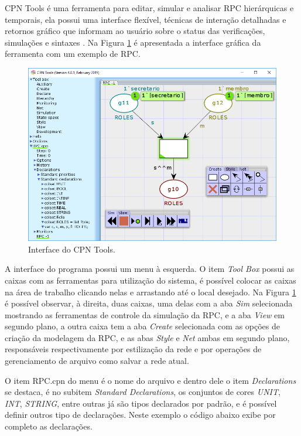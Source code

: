 CPN Tools é uma ferramenta para editar, simular e analisar RPC hierárquicas e temporais, ela possui uma interface flexível, técnicas de interação detalhadas e retornos gráfico que informam ao usuário sobre o status das verificações, simulações e sintaxes \cite{ratzer2003cpn}. Na Figura \ref{fig:cpn} é apresentada a interface gráfica da ferramenta com um exemplo de RPC.

\begin{figure}[ht]
\centering
\includegraphics[scale=0.7]{imagens/2-cpn.png}
\caption{Interface do CPN Tools.}
\label{fig:cpn}
\end{figure}

A interface do programa possui um menu à esquerda. O item \textit{Tool Box} possui as caixas com as ferramentas para utilização do sistema, é possível colocar as caixas na área de trabalho clicando nelas e arrastando até o local desejado. Na Figura \ref{fig:cpn} é possível observar, à direita, duas caixas, uma delas com a aba \textit{Sim} selecionada mostrando as ferramentas de controle da simulação da RPC, e a aba \textit{View} em segundo plano, a outra caixa tem a aba \textit{Create} selecionada com as opções de criação da modelagem da RPC, e as abas \textit{Style} e \textit{Net} ambas em segundo plano, responsáveis  respectivamente por estilização da rede e por operações de gerenciamento de arquivo como salvar a rede atual.

O item RPC.cpn do menu é o nome do arquivo e dentro dele o item \textit{Declarations} se destaca, é no subitem \textit{Standard Declarations}, os conjuntos de cores \textit{UNIT}, \textit{INT}, \textit{STRING}, entre outras já são tipos declarados por padrão, e é possível definir outros tipo de declarações. Neste exemplo o código abaixo exibe por completo as declarações.

